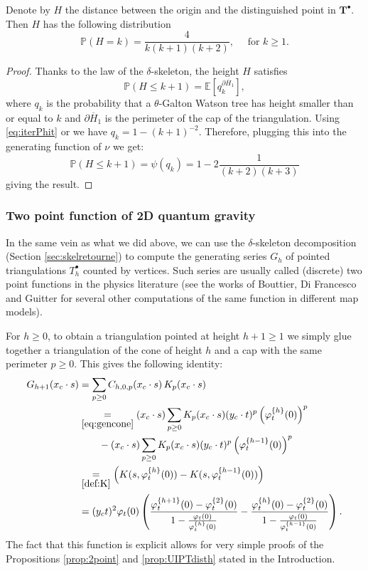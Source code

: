 \documentclass[AHL,XML,longabstracts,Unicode,NoSaveZebib]{cedram}
\begin{document}
\begin{corollary} Denote by $H$ the distance between the origin and the distinguished point in $ \mathbf{T}^{\bullet}$. Then $H$ has the following distribution
$$ \mathbb{P}(H=k) = \frac{4}{k(k+1)(k+2)}, \quad \mbox{ for } k \geq 1. $$
\end{corollary}
\begin{proof}
Thanks to the law of the $\delta$-skeleton, the height $H$ satisfies
$$ \mathbb{P}( H \leq k+1) = \mathbb{E}[q_{k}^{\partial \overline{H}_{1}}],$$
where $q_{k}$ is the probability that a $\theta$-Galton Watson tree has height smaller than or equal to $k$ and $\partial \overline{H}_{1}$ is the perimeter of the cap of the triangulation. Using \eqref{eq:iterPhit} or \cite[Eq (28)]{CLGfpp} we have $q_{k} = 1-(k+1)^{-2}$. Therefore, plugging this into the generating function of $\nu$ we get:
\[
\mathbb{P}( H \leq k+1) = \psi(q_k) = 1 - 2 \frac{1}{(k+2)(k+3)}
\]
giving the result.
\end{proof}

\subsubsection{Two point function of 2D quantum gravity}
\label{sec:2point}
In the same vein as what we did above, we can use the $\delta$-skeleton decomposition (Section \ref{sec:skelretourne}) to compute the generating series $G_h$ of pointed triangulations $T^{\bullet}_{h}$ counted by vertices. Such series are usually called (discrete) two point functions in the physics literature (see the works of Bouttier, Di Francesco and Guitter \cite{BDFG03,BG12,G17} for several other computations of the same function in different map models).


For $h \geq 0$, to obtain a triangulation pointed at height $h + 1 \geq 1$ we simply glue together a triangulation of the cone of height $h$ and a cap with the same perimeter $p \geq 0$. This gives the following identity:
\begin{align}
G_{h+1}(x_c \cdot s) &= \sum_{p\geq 0} C_{h,0,p}(x_c \cdot s) \, K_p(x_c \cdot s)\nonumber \\
& \underset{ \eqref{eq:gencone}}{=}
(x_c \cdot s) \sum_{p\geq 0} K_p(x_c \cdot s)  (y_c \cdot t)^{p} \left(\varphi_t^{\{h\}} (0) \right)^p \nonumber\\
& \qquad -
(x_c \cdot s) \sum_{p\geq 0} K_p(x_c \cdot s)
 (y_c \cdot t)^{p} \left(\varphi_t^{\{h-1\}} (0) \right)^p
\nonumber \\
&\underset{ \eqref{def:K}}{=} \left( K(s, \varphi_t^{\{h\}}(0)) -  K(s, \varphi_t^{\{h-1\}}(0)) \right)\nonumber \\
& = ( y_c t )^2 \varphi_t(0) \left(
\frac{
\varphi_t^{\{h+1\} }(0)
- \varphi^{\{2\}}_t(0)
}
{
1-
\frac{\varphi_t(0)}{\varphi_t^{\{h\}}(0)}
}
-
\frac{
\varphi_t^{\{h\}}(0)
- \varphi^{\{2\}}_t(0)
}
{
1-
\frac{\varphi_t(0)}{\varphi_t^{\{h-1\}}(0)}
}
\right). \label{eq:gcexact}
\end{align}
The fact that this function is explicit allows for very simple proofs of the Propositions \ref{prop:2point} and \ref{prop:UIPTdisth} stated in the Introduction.
\end{document}
